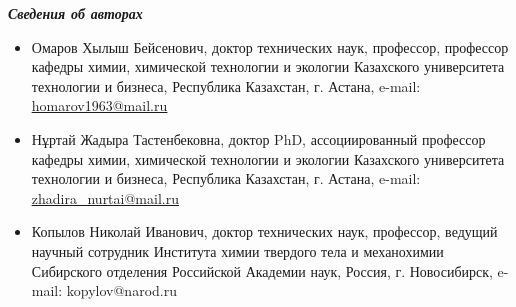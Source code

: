 \begin{center}
\emph{{\bfseries Сведения об авторах}}
\end{center}

\begin{itemize}
\item
Омаров Хылыш Бейсенович, доктор технических наук, профессор, профессор
кафедры химии, химической технологии и экологии Казахского университета
технологии и бизнеса, Республика Казахстан, г. Астана, e-mail:
\href{mailto:homarov1963@mail.ru}{\ul{homarov1963@mail.ru}}

\item
Нұртай Жадыра Тастенбековна, доктор PhD, ассоциированный профессор
кафедры химии, химической технологии и экологии Казахского университета
технологии и бизнеса, Республика Казахстан, г. Астана, e-mail:
\href{mailto:zhadira_nurtai@mail.ru}{\ul{zhadira\_nurtai@mail.ru}}

\item
Копылов Николай Иванович, доктор технических наук, профессор, ведущий
научный сотрудник Института химии твердого тела и механохимии Сибирского
отделения Российской Академии наук, Россия, г. Новосибирск, e-mail:
kopylov@narod.ru
\end{itemize}
